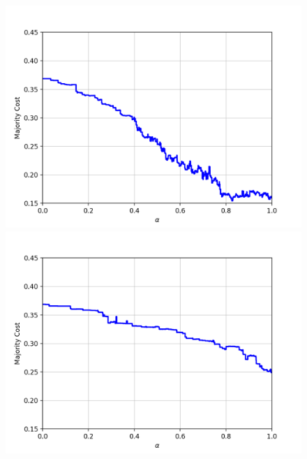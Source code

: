 \begin{figure}[h]
\centering
\begin{minipage}{.3\textwidth}
  \centering
  \includegraphics[width=\linewidth]{plots/nell_sc}
\end{minipage}
\begin{minipage}{.3\textwidth}
  \centering
  \includegraphics[width=\linewidth]{plots/nell_sa}
\end{minipage}
\begin{minipage}{.3\textwidth}
  \centering

\end{minipage}
\end{figure}
